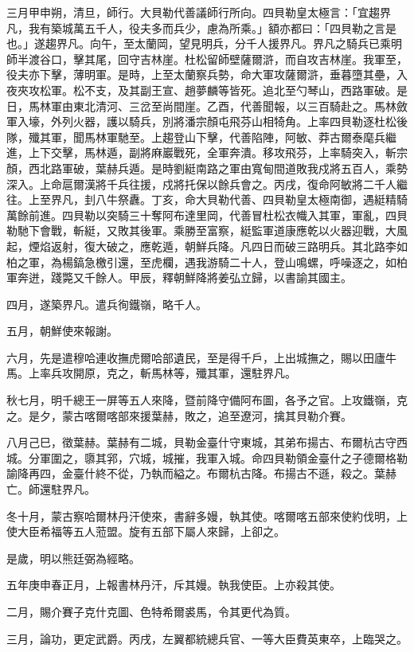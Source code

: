 \begin{pinyinscope}
三月甲申朔，清旦，師行。大貝勒代善議師行所向。四貝勒皇太極言：「宜趨界凡，我有築城萬五千人，役夫多而兵少，慮為所乘。」額亦都曰：「四貝勒之言是也。」遂趨界凡。向午，至太蘭岡，望見明兵，分千人援界凡。界凡之騎兵已乘明師半渡谷口，擊其尾，回守吉林崖。杜松留師壁薩爾滸，而自攻吉林崖。我軍至，役夫亦下擊，薄明軍。是時，上至太蘭察兵勢，命大軍攻薩爾滸，垂暮墮其壘，入夜夾攻松軍。松不支，及其副王宣、趙夢麟等皆死。追北至勺琴山，西路軍破。是日，馬林軍由東北清河、三岔至尚間崖。乙酉，代善聞報，以三百騎赴之。馬林斂軍入壕，外列火器，護以騎兵，別將潘宗顏屯飛芬山相犄角。上率四貝勒逐杜松後隊，殲其軍，聞馬林軍馳至。上趨登山下擊，代善陷陣，阿敏、莽古爾泰麾兵繼進，上下交擊，馬林遁，副將麻巖戰死，全軍奔潰。移攻飛芬，上率騎突入，斬宗顏，西北路軍破，葉赫兵遁。是時劉綎南路之軍由寬甸間道敗我戍將五百人，乘勢深入。上命扈爾漢將千兵往援，戍將托保以餘兵會之。丙戌，復命阿敏將二千人繼往。上至界凡，刲八牛祭纛。丁亥，命大貝勒代善、四貝勒皇太極南御，遇綎精騎萬餘前進。四貝勒以突騎三十奪阿布達里岡，代善冒杜松衣幟入其軍，軍亂，四貝勒馳下會戰，斬綎，又敗其後軍。乘勝至富察，綎監軍道康應乾以火器迎戰，大風起，煙焰返射，復大破之，應乾遁，朝鮮兵降。凡四日而破三路明兵。其北路李如柏之軍，為楊鎬急檄引還，至虎欄，遇我游騎二十人，登山鳴螺，呼噪逐之，如柏軍奔迸，踐斃又千餘人。甲辰，釋朝鮮降將姜弘立歸，以書諭其國主。

四月，遂築界凡。遣兵徇鐵嶺，略千人。

五月，朝鮮使來報謝。

六月，先是遣穆哈連收撫虎爾哈部遺民，至是得千戶，上出城撫之，賜以田廬牛馬。上率兵攻開原，克之，斬馬林等，殲其軍，還駐界凡。

秋七月，明千總王一屏等五人來降，暨前降守備阿布圖，各予之官。上攻鐵嶺，克之。是夕，蒙古喀爾喀部來援葉赫，敗之，追至遼河，擒其貝勒介賽。

八月己巳，徵葉赫。葉赫有二城，貝勒金臺什守東城，其弟布揚古、布爾杭古守西城。分軍圍之，隳其郛，穴城，城摧，我軍入城。命四貝勒領金臺什之子德爾格勒諭降再四，金臺什終不從，乃執而縊之。布爾杭古降。布揚古不遜，殺之。葉赫亡。師還駐界凡。

冬十月，蒙古察哈爾林丹汗使來，書辭多嫚，執其使。喀爾喀五部來使約伐明，上使大臣希福等五人蒞盟。旋有五部下屬人來歸，上卻之。

是歲，明以熊廷弼為經略。

五年庚申春正月，上報書林丹汗，斥其嫚。執我使臣。上亦殺其使。

二月，賜介賽子克什克圖、色特希爾裘馬，令其更代為質。

三月，論功，更定武爵。丙戌，左翼都統總兵官、一等大臣費英東卒，上臨哭之。


\end{pinyinscope}
